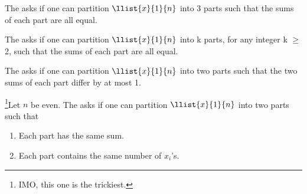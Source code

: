 \documentclass{article}
\begin{document}

\begin{subexercise}
  The  asks if one can partition $ \llist{x}{1}{n} $ into 3 parts such that the sums of each part are all equal.
\end{subexercise}

\begin{solution}

\end{solution}
\pagebreak


\begin{subexercise}
  The  asks if one can partition $ \llist{x}{1}{n} $ into k parts, for any integer k $ \geq $ 2, such that the sums of each part are all equal.
\end{subexercise}

\begin{solution}

\end{solution}
\pagebreak


\begin{subexercise}
  The  asks if one can partition $ \llist{x}{1}{n} $ into two parts such that the two sums of each part differ by at most 1.
\end{subexercise}

\begin{solution}

\end{solution}
\pagebreak


\begin{subexercise}
  \footnote[3]{IMO, this one is the trickiest.}Let $n$ be even.
  The  asks if one can partition $ \llist{x}{1}{n} $ into two parts such that
  \begin{enumerate}[label=(\alph*)]
    \item Each part has the same sum.
    \item Each part contains the same number of $ x_i $'s.
  \end{enumerate}
\end{subexercise}

\begin{solution}

\end{solution}
\end{document}
